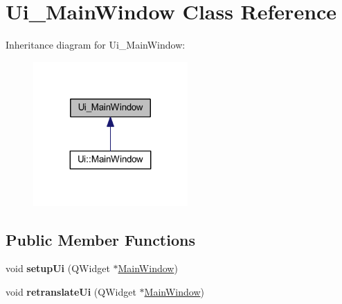 \hypertarget{class_ui___main_window}{}\section{Ui\+\_\+\+Main\+Window Class Reference}
\label{class_ui___main_window}


Inheritance diagram for Ui\+\_\+\+Main\+Window\+:
\nopagebreak
\begin{figure}[H]
\begin{center}
\leavevmode
\includegraphics[width=167pt]{class_ui___main_window__inherit__graph}
\end{center}
\end{figure}
\subsection*{Public Member Functions}
\begin{DoxyCompactItemize}
\item 
\mbox{\label{class_ui___main_window_a306e3013ead511f9bc29513aa0219579}} 
void {\bfseries setup\+Ui} (Q\+Widget $\ast$\mbox{\hyperlink{class_main_window}{Main\+Window}})
\item 
\mbox{\label{class_ui___main_window_ae4964a56cb4d6d76b7a398fd76b200e2}} 
void {\bfseries retranslate\+Ui} (Q\+Widget $\ast$\mbox{\hyperlink{class_main_window}{Main\+Window}})
\end{DoxyCompactItemize}
